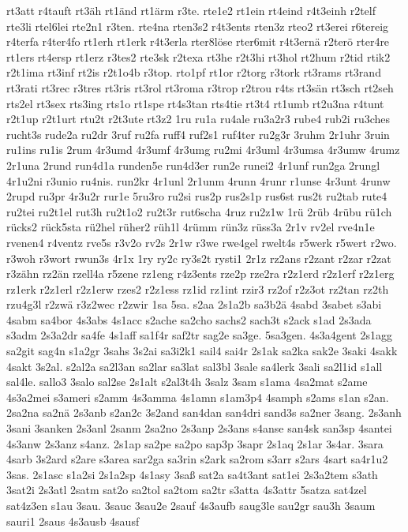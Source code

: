 {rt3att
r4tauft
rt3äh
rt1änd
rt1ärm
r3te.
rte1e2
rt1ein
rt4eind
r4t3einh
r2telf
rte3li
rtel6lei
rte2n1
r3ten.
rte4na
rten3s2
r4t3ents
rten3z
rteo2
rt3erei
r6tereig
r4terfa
r4ter4fo
rt1erh
rt1erk
r4t3erla
rter8löse
rter6mit
r4t3ernä
r2terö
rter4re
rt1ers
rt4ersp
rt1erz
r3tes2
rte3sk
r2texa
rt3he
r2t3hi
rt3hol
rt2hum
r2tid
rtik2
r2t1ima
rt3inf
rt2is
r2t1o4b
r3top.
rto1pf
rt1or
r2torg
r3tork
rt3rams
rt3rand
rt3rati
rt3rec
r3tres
rt3ris
rt3rol
rt3roma
r3trop
r2trou
r4ts
rt3sän
rt3sch
rt2seh
rts2el
rt3sex
rts3ing
rts1o
rt1spe
rt4s3tan
rts4tie
rt3t4
rt1umb
rt2u3na
r4tunt
r2t1up
r2t1urt
rtu2t
r2t3ute
rt3z2
1ru
ru1a
ru4ale
ru3a2r3
rube4
rub2i
ru3ches
rucht3s
rude2a
ru2dr
3ruf
ru2fa
ruff4
ruf2s1
ruf4ter
ru2g3r
3ruhm
2r1uhr
3ruin
ru1ins
ru1is
2rum
4r3umd
4r3umf
4r3umg
ru2mi
4r3uml
4r3umsa
4r3umw
4rumz
2r1una
2rund
run4d1a
runden5e
run4d3er
run2e
runei2
4r1unf
run2ga
2rungl
4r1u2ni
r3unio
ru4nis.
run2kr
4r1unl
2r1unm
4runn
4runr
r1unse
4r3unt
4runw
2rupd
ru3pr
4r3u2r
rur1e
5ru3ro
ru2si
rus2p
rus2s1p
rus6st
rus2t
ru2tab
rute4
ru2tei
ru2t1el
rut3h
ru2t1o2
ru2t3r
rut6scha
4ruz
ru2z1w
1rü
2rüb
4rübu
rü1ch
rücks2
rück5sta
rü2hel
rüher2
rüh1l
4rümm
rün3z
rüss3a
2r1v
rv2el
rve4n1e
rvenen4
r4ventz
rve5s
r3v2o
rv2s
2r1w
r3we
rwe4gel
rwelt4s
r5werk
r5wert
r2wo.
r3woh
r3wort
rwun3s
4r1x
1ry
ry2c
ry3s2t
rysti1
2r1z
rz2ans
r2zant
r2zar
r2zat
r3zähn
rz2än
rzell4a
r5zene
rz1eng
r4z3ents
rze2p
rze2ra
r2z1erd
r2z1erf
r2z1erg
rz1erk
r2z1erl
r2z1erw
rzes2
r2z1ess
rz1id
rz1int
rzir3
rz2of
r2z3ot
rz2tan
rz2th
rzu4g3l
r2zwä
r3z2wec
r2zwir
1sa
5sa.
s2aa
2s1a2b
sa3b2ä
4sabd
3sabet
s3abi
4sabm
sa4bor
4s3abs
4s1acc
s2ache
sa2cho
sachs2
sach3t
s2ack
s1ad
2s3ada
s3adm
2s3a2dr
sa4fe
4s1aff
sa1f4r
saf2tr
sag2e
sa3ge.
5sa3gen.
4s3a4gent
2s1agg
sa2git
sag4n
s1a2gr
3sahs
3s2ai
sa3i2k1
sail4
sai4r
2s1ak
sa2ka
sak2e
3saki
4sakk
4sakt
3s2al.
s2al2a
sa2l3an
sa2lar
sa3lat
sal3bl
3sale
sa4lerk
3sali
sa2l1id
s1all
sal4le.
sallo3
3salo
sal2se
2s1alt
s2al3t4h
3salz
3sam
s1ama
4sa2mat
s2ame
4s3a2mei
s3ameri
s2amm
4s3amma
4s1amn
s1am3p4
4samph
s2ams
s1an
s2an.
2sa2na
sa2nä
2s3anb
s2an2c
3s2and
san4dan
san4dri
sand3s
sa2ner
3sang.
2s3anh
3sani
3sanken
2s3anl
2sanm
2sa2no
2s3anp
2s3ans
s4anse
san4sk
san3sp
4santei
4s3anw
2s3anz
s4anz.
2s1ap
sa2pe
sa2po
sap3p
3sapr
2s1aq
2s1ar
3s4ar.
3sara
4sarb
3s2ard
s2are
s3area
sar2ga
sa3rin
s2ark
sa2rom
s3arr
s2ars
4sart
sa4r1u2
3sas.
2s1asc
s1a2si
2s1a2sp
4s1asy
3saß
sat2a
sa4t3ant
sat1ei
2s3a2tem
s3ath
3sat2i
2s3atl
2satm
sat2o
sa2tol
sa2tom
sa2tr
s3atta
4s3attr
5satza
sat4zel
sat4z3en
s1au
3sau.
3sauc
3sau2e
2sauf
4s3aufb
saug3le
sau2gr
sau3h
3saum
sauri1
2saus
4s3ausb
4sausf
}
